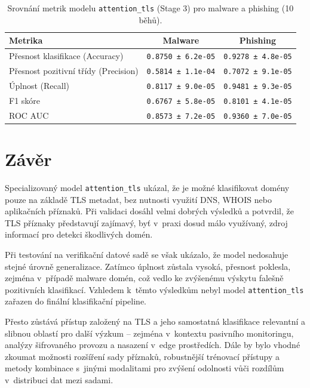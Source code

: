 \begin{table}[h!]
\centering
\begin{tabular}{|l|c|c|}
\hline
\textbf{Metrika} & \textbf{Malware} & \textbf{Phishing} \\
\hline
Přesnost klasifikace (Accuracy)      & \texttt{0.8750 ± 6.2e-05} & \texttt{0.9278 ± 4.8e-05} \\
Přesnost pozitivní třídy (Precision) & \texttt{0.5814 ± 1.1e-04} & \texttt{0.7072 ± 9.1e-05} \\
Úplnost (Recall)                     & \texttt{0.8117 ± 9.0e-05} & \texttt{0.9481 ± 9.3e-05} \\
F1 skóre                             & \texttt{0.6767 ± 5.8e-05} & \texttt{0.8101 ± 4.1e-05} \\
ROC AUC                              & \texttt{0.8573 ± 7.2e-05} & \texttt{0.9360 ± 7.0e-05} \\
\hline
\end{tabular}
\caption{Srovnání metrik modelu \texttt{attention\_tls} (Stage 3) pro malware a phishing (10 běhů).}
\label{tab:tls_attention_combined}
\end{table}

\section*{Závěr}

Specializovaný model \texttt{attention\_tls} ukázal, že je možné klasifikovat domény pouze na základě TLS metadat, bez nutnosti využití DNS, WHOIS nebo aplikačních příznaků. Při validaci dosáhl velmi dobrých výsledků a potvrdil, že TLS příznaky představují zajímavý, byť v~praxi dosud málo využívaný, zdroj informací pro detekci škodlivých domén.

Při testování na verifikační datové sadě se však ukázalo, že model nedosahuje stejné úrovně generalizace. Zatímco úplnost zůstala vysoká, přesnost poklesla, zejména v~případě malware domén, což vedlo ke zvýšenému výskytu falešně pozitivních klasifikací. Vzhledem k~těmto výsledkům nebyl model \texttt{attention\_tls} zařazen do finální klasifikační pipeline.

Přesto zůstává přístup založený na TLS a jeho samostatná klasifikace relevantní a slibnou oblastí pro další výzkum – zejména v~kontextu pasivního monitoringu, analýzy šifrovaného provozu a nasazení v~edge prostředích. Dále by bylo vhodné zkoumat možnosti rozšíření sady příznaků, robustnější trénovací přístupy a metody kombinace s~jinými modalitami pro zvýšení odolnosti vůči rozdílům v~distribuci dat mezi sadami.






